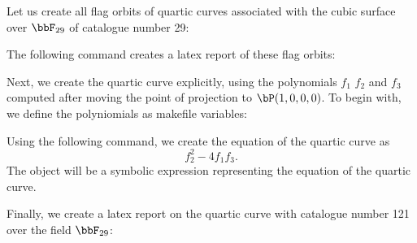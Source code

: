 


\bigskip



Let us create all flag orbits of quartic curves associated with the cubic surface over $\bbF_{29}$ of catalogue number 29:






\bigskip




The following command creates a latex report of these flag orbits:




\bigskip




Next, we create the quartic curve explicitly, 
using the polynomials $f_1$ $f_2$ and $f_3$ 
computed after moving the point of projection to $\bP(1,0,0,0)$. 
To begin with, we define the polyniomials 
as makefile variables:





Using the following command, we create the equation of the quartic curve as 
$$
f_2^2-4f_1f_3.
$$
The object will be a symbolic expression representing the equation of the quartic curve.



\bigskip


Finally, we create a latex report on the quartic curve with catalogue 
number 121 over the field $\bbF_{29}$:







\bigskip
